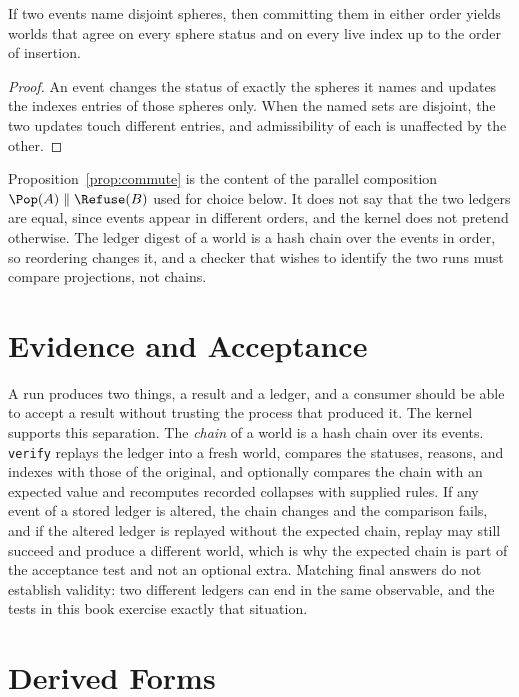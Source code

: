 \begin{proposition}\label{prop:commute}
If two events name disjoint spheres, then committing them in either order yields worlds that agree on every sphere status and on every live index up to the order of insertion.
\end{proposition}

\begin{proof}
An event changes the status of exactly the spheres it names and updates the indexes entries of those spheres only. When the named sets are disjoint, the two updates touch different entries, and admissibility of each is unaffected by the other.
\end{proof}

Proposition~\ref{prop:commute} is the content of the parallel composition $\Pop(A)\parallel\Refuse(B)$ used for choice below. It does not say that the two ledgers are equal, since events appear in different orders, and the kernel does not pretend otherwise. The ledger digest of a world is a hash chain over the events in order, so reordering changes it, and a checker that wishes to identify the two runs must compare projections, not chains.


\section{Evidence and Acceptance}

A run produces two things, a result and a ledger, and a consumer should be able to accept a result without trusting the process that produced it. The kernel supports this separation. The \emph{chain} of a world is a hash chain over its events. \texttt{verify} replays the ledger into a fresh world, compares the statuses, reasons, and indexes with those of the original, and optionally compares the chain with an expected value and recomputes recorded collapses with supplied rules. If any event of a stored ledger is altered, the chain changes and the comparison fails, and if the altered ledger is replayed without the expected chain, replay may still succeed and produce a different world, which is why the expected chain is part of the acceptance test and not an optional extra. Matching final answers do not establish validity: two different ledgers can end in the same observable, and the tests in this book exercise exactly that situation.

\section{Derived Forms}

